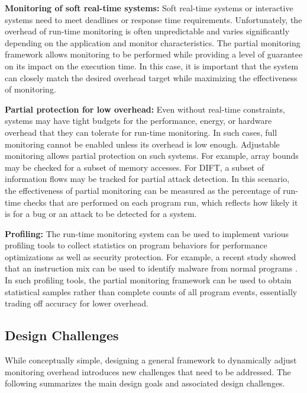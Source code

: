 {\bf Monitoring of soft real-time systems:}
Soft real-time systems or interactive systems need to meet deadlines or response
time requirements. Unfortunately, the overhead of run-time monitoring is often 
unpredictable and varies significantly depending on the application and monitor
characteristics. The partial monitoring framework allows monitoring to be performed
while providing a level of guarantee on its impact on the execution time. 
In this case, it is important that the system can closely match the desired
overhead target while maximizing the effectiveness of monitoring.

{\bf Partial protection for low overhead:}
Even without real-time constraints, systems may have tight budgets for the performance,
energy, or hardware overhead that they can tolerate for run-time monitoring. In such cases,
full monitoring cannot be enabled unless its overhead is low enough. Adjustable
monitoring allows partial protection on such systems. For example, array bounds
may be checked for a subset of memory accesses. For DIFT, a subset of information flows
may be tracked for partial attack detection. In this scenario, the effectiveness of 
partial monitoring can be measured as the percentage of run-time checks that are
performed on each program run, which reflects how likely it is for a bug or an attack 
to be detected for a system. 

{\bf Profiling:} 
The run-time monitoring system can be used to implement various profiling tools
to collect statistics on program behaviors for performance optimizations as well
as security protection. For example, a recent study showed that an instruction
mix can be used to identify malware from normal programs \cite{demme-isca13, tang-raid14}. 
In such profiling tools, the partial monitoring framework can be used to obtain
statistical samples rather than complete counts of all program events, essentially trading off
accuracy for lower overhead.

\subsection{Design Challenges}

While conceptually simple, designing a general framework to dynamically adjust monitoring
overhead introduces new challenges that need to be addressed.  
The following summarizes the main design goals and associated design challenges.

